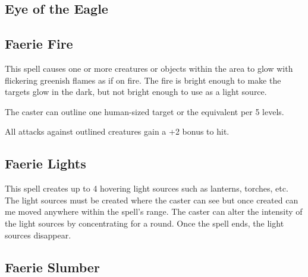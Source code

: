 \begin{multicols*}{2}
\subsection{Eye of the Eagle}\label{spell:Eye of the Eagle}



\subsection{Faerie Fire}\label{spell:Faerie Fire}

This spell causes one or more creatures or objects within the area to glow with flickering greenish flames as if on fire. The fire is bright enough to make the targets glow in the dark, but not bright enough to use as a light source.

The caster can outline one human-sized target or the equivalent per 5 levels.

All attacks against outlined creatures gain a +2 bonus to hit.

\subsection{Faerie Lights}\label{spell:Faerie Lights}

This spell creates up to 4 hovering light sources such as lanterns, torches, etc. The light sources must be created where the caster can see but once created can me moved anywhere within the spell's range. The caster can alter the intensity of the light sources by concentrating for a round. Once the spell ends, the light sources disappear.

\subsection{Faerie Slumber}\label{spell:Faerie Slumber}
\end{multicols*}
